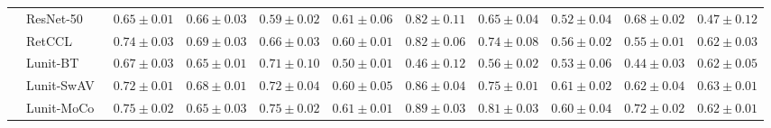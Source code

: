 \begin{tabular}{ll|cccc|c|cccc}
 & ResNet-50~\cite{he2015deep} & $0.65 \pm 0.01$ & $0.66 \pm 0.03$ & $0.59 \pm 0.02$ & $0.61 \pm 0.06$ & $0.82 \pm 0.11$ & $0.65 \pm 0.04$ & $0.52 \pm 0.04$ & $0.68 \pm 0.02$ & $0.47 \pm 0.12$ \\
 & RetCCL~\cite{wang2023retccl} & $0.74 \pm 0.03$ & $0.69 \pm 0.03$ & $0.66 \pm 0.03$ & $0.60 \pm 0.01$ & $0.82 \pm 0.06$ & $0.74 \pm 0.08$ & $0.56 \pm 0.02$ & $0.55 \pm 0.01$ & $0.62 \pm 0.03$ \\
 & Lunit-BT~\cite{kang2023benchmarking} & $0.67 \pm 0.03$ & $0.65 \pm 0.01$ & $0.71 \pm 0.10$ & $0.50 \pm 0.01$ & $0.46 \pm 0.12$ & $0.56 \pm 0.02$ & $0.53 \pm 0.06$ & $0.44 \pm 0.03$ & $0.62 \pm 0.05$ \\
 & Lunit-SwAV~\cite{kang2023benchmarking} & $0.72 \pm 0.01$ & $0.68 \pm 0.01$ & $0.72 \pm 0.04$ & $0.60 \pm 0.05$ & $0.86 \pm 0.04$ & $0.75 \pm 0.01$ & $0.61 \pm 0.02$ & $0.62 \pm 0.04$ & $0.63 \pm 0.01$ \\
 & Lunit-MoCo~\cite{kang2023benchmarking} & $0.75 \pm 0.02$ & $0.65 \pm 0.03$ & $0.75 \pm 0.02$ & $0.61 \pm 0.01$ & $0.89 \pm 0.03$ & $0.81 \pm 0.03$ & $0.60 \pm 0.04$ & $0.72 \pm 0.02$ & $0.62 \pm 0.01$ \\
\cline{1-11}
\bottomrule
\end{tabular}
